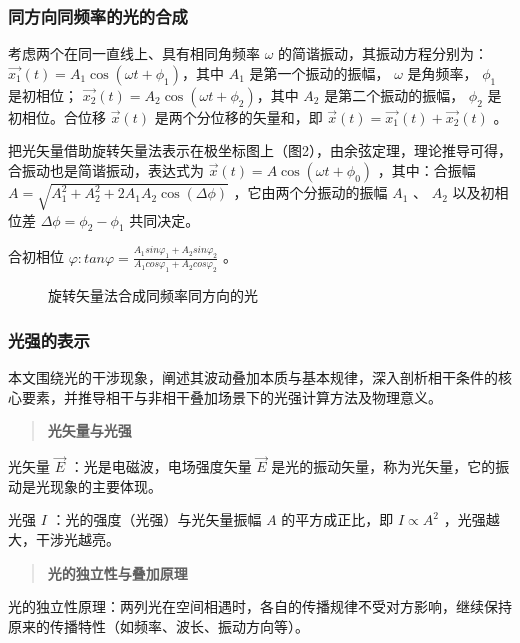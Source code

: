 \documentclass{ctexart}
\begin{document}
\subsubsection{同方向同频率的光的合成}
考虑两个在同一直线上、具有相同角频率 $\omega$ 的简谐振动，其振动方程分别为：
$ \overrightarrow{x_1}(t) = A_1 \cos(\omega t + \phi_{1})$，其中 $A_1$ 是第一个振动的振幅， $\omega$ 是角频率， $\phi_{1}$ 是初相位；
$\overrightarrow{x_2}(t) = A_2 \cos(\omega t + \phi_{2})$，其中 $A_2$ 是第二个振动的振幅， $\phi_{2}$ 是初相位。合位移 $\overrightarrow{x}(t)$ 是两个分位移的矢量和，即 $\overrightarrow{x}(t) = \overrightarrow{x_1}(t) + \overrightarrow{x_2}(t)$ 。

把光矢量借助旋转矢量法表示在极坐标图上（图2），由余弦定理，理论推导可得，合振动也是简谐振动，表达式为 $\overrightarrow{x}(t) = A \cos(\omega t + \phi_0)$ ，其中：合振幅 $A = \sqrt{A_1^2 + A_2^2 + 2 A_1 A_2 \cos(\Delta \phi)}$ ，它由两个分振动的振幅 $A_1$ 、 $A_2$ 以及初相位差 $\Delta \phi = \phi_{2} - \phi_{1}$ 共同决定。

合初相位 \(\varphi:tan\varphi = \frac{A_{1}sin\varphi_{1} + A_{2}sin\varphi_{2}}{A_{1}cos\varphi_{1} + A_{2}cos\varphi_{2}}\) 。

\begin{figure}[ht]
    \centering
    \fbox{\rule{2cm}{0pt} \rule{0pt}{2cm}} %
    \caption{旋转矢量法合成同频率同方向的光}
    \label{fig:2}
\end{figure}

\subsubsection{光强的表示}
本文围绕光的干涉现象，阐述其波动叠加本质与基本规律，深入剖析相干条件的核心要素，并推导相干与非相干叠加场景下的光强计算方法及物理意义。


\begin{quote}
    \textbf{光矢量与光强}
\end{quote}

光矢量 $\vec{E}$ ：光是电磁波，电场强度矢量 $\vec{E}$ 是光的振动矢量，称为光矢量，它的振动是光现象的主要体现。

光强 $I$ ：光的强度（光强）与光矢量振幅 $A$ 的平方成正比，即 $I \propto A^2$ ，光强越大，干涉光越亮。

\begin{quote}
    \textbf{光的独立性与叠加原理}
\end{quote}


光的独立性原理：两列光在空间相遇时，各自的传播规律不受对方影响，继续保持原来的传播特性（如频率、波长、振动方向等）。
\end{document}
